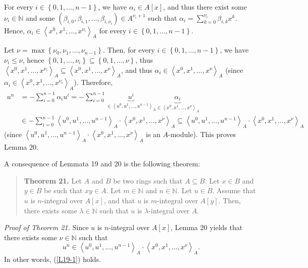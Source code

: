 \documentclass[12pt,final,notitlepage,onecolumn]{article}%
\begin{document}
For every $i\in\left\{  0,1,...,n-1\right\}  $, we have $\alpha_{i}\in
A\left[  x\right]  $, and thus there exist some $\nu_{i}\in\mathbb{N}$ and
some $\left(  \beta_{i,0},\beta_{i,1},...,\beta_{i,\nu_{i}}\right)  \in
A^{\nu_{i}+1}$ such that $\alpha_{i}=\sum\limits_{k=0}^{\nu_{i}}\beta
_{i,k}x^{k}$. Hence, $\alpha_{i}\in\left\langle x^{0},x^{1},...,x^{\nu_{i}%
}\right\rangle _{A}$ for every $i\in\left\{  0,1,...,n-1\right\}  $.

Let $\nu=\max\left\{  \nu_{0},\nu_{1},...,\nu_{n-1}\right\}  $. Then, for
every $i\in\left\{  0,1,...,n-1\right\}  $, we have $\nu_{i}\leq\nu$, hence
$\left\{  0,1,...,\nu_{i}\right\}  \subseteq\left\{  0,1,...,\nu\right\}  $,
thus $\left\langle x^{0},x^{1},...,x^{\nu_{i}}\right\rangle _{A}%
\subseteq\left\langle x^{0},x^{1},...,x^{\nu}\right\rangle _{A}$, and thus
$\alpha_{i}\in\left\langle x^{0},x^{1},...,x^{\nu}\right\rangle _{A}$ (since
$\alpha_{i}\in\left\langle x^{0},x^{1},...,x^{\nu_{i}}\right\rangle _{A}$).
Therefore,%
\begin{align*}
u^{n}  &  =-\sum\limits_{i=0}^{n-1}\alpha_{i}u^{i}=-\sum\limits_{i=0}%
^{n-1}\underbrace{u^{i}}_{\in\left\langle u^{0},u^{1},...,u^{n-1}\right\rangle
_{A}}\underbrace{\alpha_{i}}_{\in\left\langle x^{0},x^{1},...,x^{\nu
}\right\rangle _{A}}\\
&  \in-\sum\limits_{i=0}^{n-1}\left\langle u^{0},u^{1},...,u^{n-1}%
\right\rangle _{A}\cdot\left\langle x^{0},x^{1},...,x^{\nu}\right\rangle
_{A}\subseteq\left\langle u^{0},u^{1},...,u^{n-1}\right\rangle _{A}%
\cdot\left\langle x^{0},x^{1},...,x^{\nu}\right\rangle _{A}%
\end{align*}
(since $\left\langle u^{0},u^{1},...,u^{n-1}\right\rangle _{A}\cdot
\left\langle x^{0},x^{1},...,x^{\nu}\right\rangle _{A}$ is an $A$-module).
This proves Lemma 20.

A consequence of Lemmata 19 and 20 is the following theorem:

\begin{quote}
\textbf{Theorem 21.} Let $A$ and $B$ be two rings such that $A\subseteq B$.
Let $x\in B$ and $y\in B$ be such that $xy\in A$. Let $m\in\mathbb{N}$ and
$n\in\mathbb{N}$. Let $u\in B$. Assume that $u$ is $n$-integral over $A\left[
x\right]  $, and that $u$ is $m$-integral over $A\left[  y\right]  $. Then,
there exists some $\lambda\in\mathbb{N}$ such that $u$ is $\lambda$-integral
over $A$.
\end{quote}

\textit{Proof of Theorem 21.} Since $u$ is $n$-integral over $A\left[
x\right]  $, Lemma 20 yields that there exists some $\nu\in\mathbb{N}$ such
that%
\[
u^{n}\in\left\langle u^{0},u^{1},...,u^{n-1}\right\rangle _{A}\cdot
\left\langle x^{0},x^{1},...,x^{\nu}\right\rangle _{A}.
\]
In other words, (\ref{L19-1}) holds.
\end{document}
